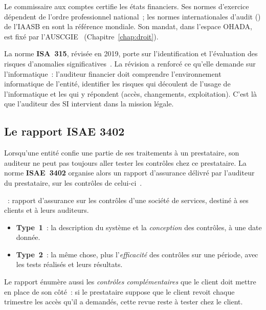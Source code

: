 Le commissaire aux comptes certifie les états financiers. Ses normes
d'exercice dépendent de l'ordre professionnel national~; les normes
internationales d'audit () de l'IAASB en sont la référence
mondiale. Son mandat, dans l'espace OHADA, est fixé par
l'AUSCGIE~\cite{ohada2014auscgie} (Chapitre~\ref{chap:droit}).

La norme \textbf{ISA~315}, révisée en 2019, porte sur l'identification et
l'évaluation des risques d'anomalies significatives~\cite{iaasb2019isa315}.
La révision a renforcé ce qu'elle demande sur l'informatique~: l'auditeur
financier doit comprendre l'environnement informatique de l'entité,
identifier les risques qui découlent de l'usage de l'informatique et les
 qui y répondent (accès, changements, exploitation). C'est
là que l'auditeur des SI intervient dans la mission légale.

\subsection{Le rapport ISAE 3402}

Lorsqu'une entité confie une partie de ses traitements à un prestataire,
son auditeur ne peut pas toujours aller tester les contrôles chez ce
prestataire. La norme \textbf{ISAE~3402} organise alors un rapport
d'assurance délivré par l'auditeur du prestataire, sur les contrôles de
celui-ci~\cite{iaasb2011isae3402}.

\begin{boxdef}
~: rapport d'assurance
sur les contrôles d'une société de services, destiné à ses clients et à
leurs auditeurs.
\begin{itemize}
    \item \textbf{Type~1}~: la description du système et la \emph{conception}
          des contrôles, à une date donnée.
    \item \textbf{Type~2}~: la même chose, plus l'\emph{efficacité} des
          contrôles sur une période, avec les tests réalisés et leurs
          résultats.
\end{itemize}
\end{boxdef}

Le rapport énumère aussi les \emph{contrôles complémentaires} que le client
doit mettre en place de son côté~: si le prestataire suppose que le client
revoit chaque trimestre les accès qu'il a demandés, cette revue reste à
tester chez le client.

